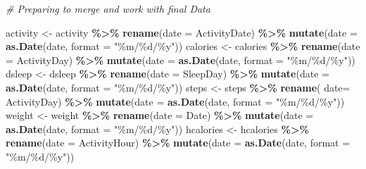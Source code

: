 \documentclass[
]{article}
\newenvironment{Shaded}{\begin{snugshade}}{\end{snugshade}}
\newcommand{\AttributeTok}[1]{\textcolor[rgb]{0.13,0.29,0.53}{#1}}
\newcommand{\CommentTok}[1]{\textcolor[rgb]{0.56,0.35,0.01}{\textit{#1}}}
\newcommand{\FunctionTok}[1]{\textcolor[rgb]{0.13,0.29,0.53}{\textbf{#1}}}
\newcommand{\NormalTok}[1]{#1}
\newcommand{\OtherTok}[1]{\textcolor[rgb]{0.56,0.35,0.01}{#1}}
\newcommand{\SpecialCharTok}[1]{\textcolor[rgb]{0.81,0.36,0.00}{\textbf{#1}}}
\newcommand{\StringTok}[1]{\textcolor[rgb]{0.31,0.60,0.02}{#1}}
\begin{document}
\begin{Shaded}
\begin{Highlighting}[]
\CommentTok{\# Preparing to merge and work with final Data}

\NormalTok{activity }\OtherTok{\textless{}{-}}\NormalTok{ activity }\SpecialCharTok{\%\textgreater{}\%} 
  \FunctionTok{rename}\NormalTok{(}\AttributeTok{date =}\NormalTok{ ActivityDate) }\SpecialCharTok{\%\textgreater{}\%} 
  \FunctionTok{mutate}\NormalTok{(}\AttributeTok{date =} \FunctionTok{as.Date}\NormalTok{(date, }\AttributeTok{format =} \StringTok{"\%m/\%d/\%y"}\NormalTok{))}
\NormalTok{calories }\OtherTok{\textless{}{-}}\NormalTok{ calories }\SpecialCharTok{\%\textgreater{}\%} 
  \FunctionTok{rename}\NormalTok{(}\AttributeTok{date =}\NormalTok{ ActivityDay) }\SpecialCharTok{\%\textgreater{}\%} 
  \FunctionTok{mutate}\NormalTok{(}\AttributeTok{date =} \FunctionTok{as.Date}\NormalTok{(date, }\AttributeTok{format =} \StringTok{"\%m/\%d/\%y"}\NormalTok{))}
\NormalTok{dsleep }\OtherTok{\textless{}{-}}\NormalTok{ dsleep }\SpecialCharTok{\%\textgreater{}\%} 
  \FunctionTok{rename}\NormalTok{(}\AttributeTok{date =}\NormalTok{ SleepDay) }\SpecialCharTok{\%\textgreater{}\%} 
  \FunctionTok{mutate}\NormalTok{(}\AttributeTok{date =} \FunctionTok{as.Date}\NormalTok{(date, }\AttributeTok{format =} \StringTok{"\%m/\%d/\%y"}\NormalTok{))}
\NormalTok{steps }\OtherTok{\textless{}{-}}\NormalTok{ steps }\SpecialCharTok{\%\textgreater{}\%} 
  \FunctionTok{rename}\NormalTok{( }\AttributeTok{date=}\NormalTok{ ActivityDay) }\SpecialCharTok{\%\textgreater{}\%} 
  \FunctionTok{mutate}\NormalTok{(}\AttributeTok{date =} \FunctionTok{as.Date}\NormalTok{(date, }\AttributeTok{format =} \StringTok{"\%m/\%d/\%y"}\NormalTok{))}
\NormalTok{weight }\OtherTok{\textless{}{-}}\NormalTok{ weight }\SpecialCharTok{\%\textgreater{}\%} 
  \FunctionTok{rename}\NormalTok{(}\AttributeTok{date =}\NormalTok{ Date) }\SpecialCharTok{\%\textgreater{}\%} 
  \FunctionTok{mutate}\NormalTok{(}\AttributeTok{date =} \FunctionTok{as.Date}\NormalTok{(date, }\AttributeTok{format =} \StringTok{"\%m/\%d/\%y"}\NormalTok{))}
\NormalTok{hcalories }\OtherTok{\textless{}{-}}\NormalTok{ hcalories }\SpecialCharTok{\%\textgreater{}\%} 
  \FunctionTok{rename}\NormalTok{(}\AttributeTok{date =}\NormalTok{ ActivityHour) }\SpecialCharTok{\%\textgreater{}\%} 
  \FunctionTok{mutate}\NormalTok{(}\AttributeTok{date =} \FunctionTok{as.Date}\NormalTok{(date, }\AttributeTok{format =} \StringTok{"\%m/\%d/\%y"}\NormalTok{))}
\end{Highlighting}
\end{Shaded}
\end{document}
